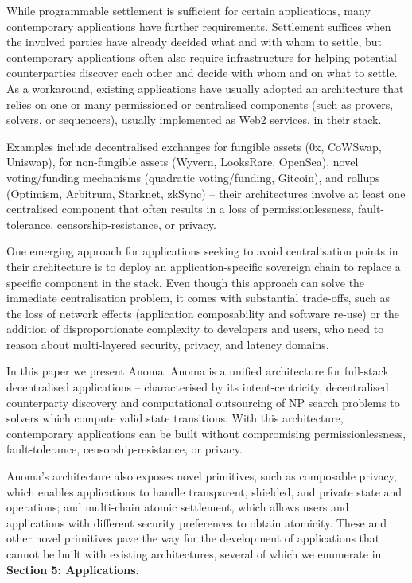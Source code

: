 \documentclass[
    9pt,            %
    commun,        %
    affiltop,       %
]{art}
\begin{document}
While programmable settlement is sufficient for certain applications,
many contemporary applications have further requirements. Settlement
suffices when the involved parties have already decided what and with
whom to settle, but contemporary applications often also require
infrastructure for helping potential counterparties discover each other
and decide with whom and on what to settle. As a workaround, existing
applications have usually adopted an architecture that relies on one or
many permissioned or centralised components (such as provers, solvers,
or sequencers), usually implemented as Web2 services, in their stack.

Examples include decentralised exchanges for fungible assets (0x,
CoWSwap, Uniswap), for non-fungible assets (Wyvern, LooksRare, OpenSea),
novel voting/funding mechanisms (quadratic voting/funding, Gitcoin), and
rollups (Optimism, Arbitrum, Starknet, zkSync) -- their architectures
involve at least one centralised component that often results in a loss
of permissionlessness, fault-tolerance, censorship-resistance, or
privacy.

One emerging approach for applications seeking to avoid centralisation
points in their architecture is to deploy an application-specific
sovereign chain to replace a specific component in the stack. Even
though this approach can solve the immediate centralisation problem, it
comes with substantial trade-offs, such as the loss of network effects
(application composability and software re-use) or the addition of
disproportionate complexity to developers and users, who need to reason
about multi-layered security, privacy, and latency domains.

In this paper we present Anoma. Anoma is a unified architecture for
full-stack decentralised applications -- characterised by its
intent-centricity, decentralised counterparty discovery and computational
outsourcing of NP search problems to solvers which compute valid state
transitions. With this architecture, contemporary applications can be built
without compromising permissionlessness, fault-tolerance,
censorship-resistance, or privacy.

Anoma's architecture also exposes novel primitives, such as
composable privacy, which enables applications to handle transparent,
shielded, and private state and operations; and multi-chain atomic
settlement, which allows users and applications with different security
preferences to obtain atomicity. These and other novel primitives pave the
way for the development of applications that cannot be built with existing
architectures, several of which we enumerate in \textbf{Section 5:
Applications}.
\end{document}
